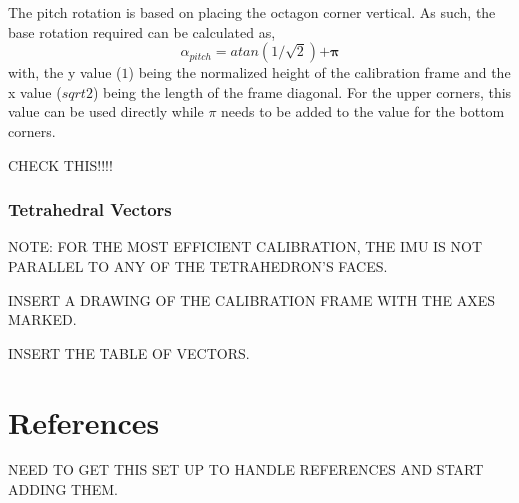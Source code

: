 \documentclass[10pt,letterpaper]{memoir} %
\begin{document}
The pitch rotation is based on placing the octagon corner vertical.  As such, the base rotation required can be calculated as,
\begin{equation}
	\alpha_{pitch} = atan(1 / \sqrt{2}) \bm{ + \pi}
\end{equation}
with, the y value ($1$) being the normalized height of the calibration frame and the x value ($sqrt{2}$) being the length of the frame diagonal.  For the upper corners, this value can be used directly while $\pi$ needs to be added to the value for the bottom corners.

CHECK THIS!!!!
	
\subsection{Tetrahedral Vectors}
NOTE: FOR THE MOST EFFICIENT CALIBRATION, THE IMU IS NOT PARALLEL TO ANY OF THE TETRAHEDRON'S FACES.  

	INSERT A DRAWING OF THE CALIBRATION FRAME WITH THE AXES MARKED.

INSERT THE TABLE OF VECTORS.

\chapter{References}
NEED TO GET THIS SET UP TO HANDLE REFERENCES AND START ADDING THEM.
\end{document}
